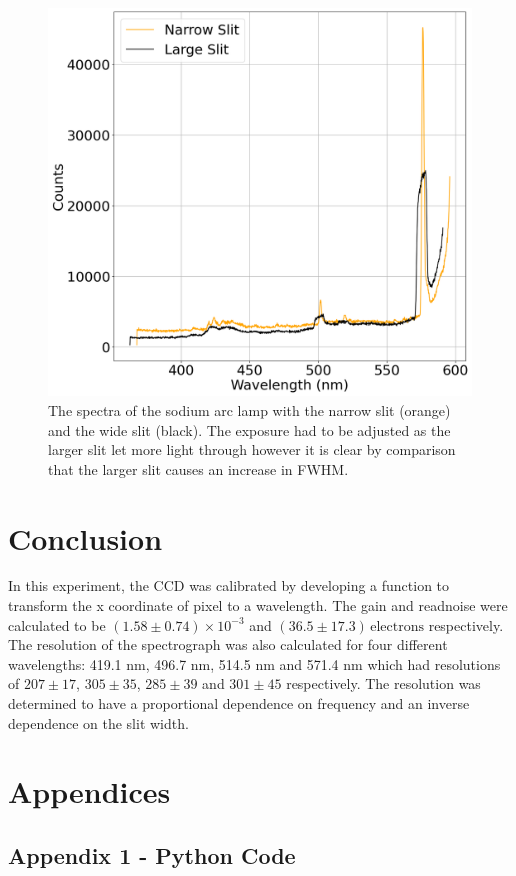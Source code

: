 \documentclass[a4paper,12pt,twocolumn]{article}
\begin{document}
		\begin{figure}
			\includegraphics[width=\columnwidth]{slitWidth.png}
			\captionsetup{font=scriptsize}
			\caption{The spectra of the sodium arc lamp with the narrow slit (orange) and the wide slit (black). The exposure had to be adjusted as the larger slit let more light through however it is clear by comparison that the larger slit causes an increase in FWHM.}
			\label{fig:slitWidth}
		\end{figure}
		
	\section{Conclusion}
		In this experiment, the CCD was calibrated by developing a function to transform the x coordinate of pixel to a wavelength. The gain and readnoise were calculated to be $(1.58 \pm 0.74)\times 10^{-3}$ and $(36.5 \pm 17.3) \,\text{electrons}$ respectively. The resolution of the spectrograph was also calculated for four different wavelengths: 419.1 nm, 496.7 nm, 514.5 nm and 571.4 nm which had resolutions of $207\pm17$, $305\pm35$, $285\pm39$ and $301\pm45$ respectively. The resolution was determined to have a proportional dependence on frequency and an inverse dependence on the slit width.
	\newpage
	\printbibliography
	
	\newpage
	\section*{Appendices}
		\subsection{Appendix 1 - Python Code}
		
\end{document}
